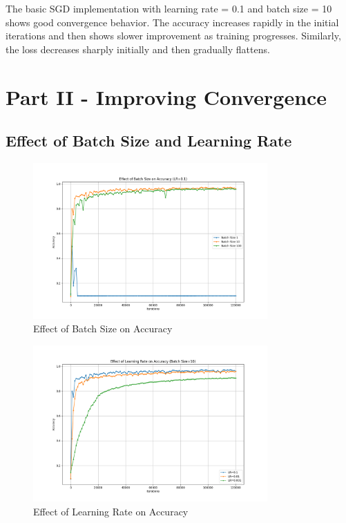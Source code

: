 \documentclass{article}
\begin{document}
The basic SGD implementation with learning rate = 0.1 and batch size = 10 shows good convergence behavior. The accuracy increases rapidly in the initial iterations and then shows slower improvement as training progresses. Similarly, the loss decreases sharply initially and then gradually flattens.

\section{Part II - Improving Convergence}

\subsection{Effect of Batch Size and Learning Rate}
\begin{figure}[h]
\centering
\includegraphics[width=0.8\textwidth]{plots/part2a_batch_size_accuracy.png}
\caption{Effect of Batch Size on Accuracy}
\end{figure}

\begin{figure}[h]
\centering
\includegraphics[width=0.8\textwidth]{plots/part2a_learning_rate_accuracy.png}
\caption{Effect of Learning Rate on Accuracy}
\end{figure}
\end{document}
